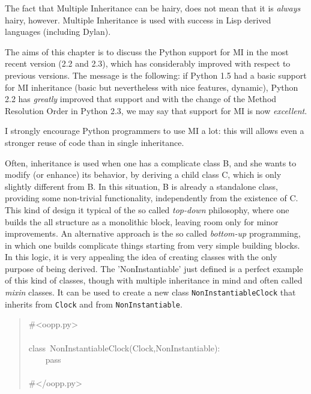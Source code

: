\documentclass[10pt,english]{article}
\begin{document}
The fact that Multiple Inheritance can be hairy, does not mean that it
is \emph{always} hairy, however. Multiple Inheritance is used with success
in Lisp derived languages (including Dylan).

The aims of this chapter is to discuss the
Python support for MI in the most recent version (2.2 and 2.3), which
has considerably improved with respect to previous versions.
The message is the following: if Python 1.5 had a basic support for
MI inheritance (basic but nevertheless with nice features, dynamic),
Python 2.2 has \emph{greatly} improved that support and with the
change of the Method Resolution Order in Python 2.3, we may say
that support for MI is now \emph{excellent}.

I strongly encourage Python programmers to use MI a lot: this will
allows even a stronger reuse of code than in single inheritance.

Often, inheritance is used when one has a complicate class B, and she wants 
to modify (or enhance) its behavior, by deriving a child class C, which is 
only slightly different from B. In this situation,  B is already a standalone 
class, providing some non-trivial functionality, independently from 
the existence of C.  This kind of design it typical of the so called
\emph{top-down} philosophy, where one builds the 
all structure as a monolithic block, leaving room only for minor improvements.
An alternative approach is the so called \emph{bottom-up} programming, in 
which one builds complicate things starting from very simple building blocks. 
In this logic, it is very appealing the idea of creating classes with the
only purpose of being derived. The 'NonInstantiable' just defined is a
perfect example of this kind of classes, though with multiple inheritance
in mind and often called \emph{mixin} classes.
It can be used to create a new class \texttt{NonInstantiableClock} 
that inherits from \texttt{Clock} and from \texttt{NonInstantiable}.
\begin{quote}
\begin{ttfamily}\begin{flushleft}
\mbox{{\#}<oopp.py>}\\
\mbox{}\\
\mbox{class~NonInstantiableClock(Clock,NonInstantiable):~}\\
\mbox{~~~~pass}\\
\mbox{}\\
\mbox{{\#}</oopp.py>}
\end{flushleft}\end{ttfamily}
\end{quote}
\end{document}
